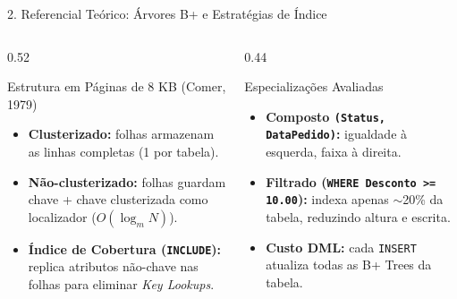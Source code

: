 \documentclass[aspectratio=169,11pt]{beamer}
\begin{document}
\begin{frame}{2. Referencial Teórico: Árvores B+ e Estratégias de Índice}
  \begin{columns}[T]
    \begin{column}{0.52\textwidth}
      \begin{block}{Estrutura em Páginas de 8 KB (Comer, 1979)}
        \begin{itemize}
          \item \textbf{Clusterizado:} folhas armazenam as linhas completas (1 por tabela).
          \item \textbf{Não-clusterizado:} folhas guardam chave + chave clusterizada como localizador ($O(\log_m N)$).
          \item \textbf{Índice de Cobertura (\texttt{INCLUDE}):} replica atributos não-chave nas folhas para eliminar \textit{Key Lookups}.
        \end{itemize}
      \end{block}
    \end{column}
    \begin{column}{0.44\textwidth}
      \begin{block}{Especializações Avaliadas}
        \begin{itemize}
          \item \textbf{Composto \texttt{(Status, DataPedido)}:} igualdade à esquerda, faixa à direita.
          \item \textbf{Filtrado (\texttt{WHERE Desconto >= 10.00}):} indexa apenas $\sim$20\% da tabela, reduzindo altura e escrita.
          \item \textbf{Custo DML:} cada \texttt{INSERT} atualiza todas as B+ Trees da tabela.
        \end{itemize}
      \end{block}
    \end{column}
  \end{columns}
\end{frame}
\end{document}
